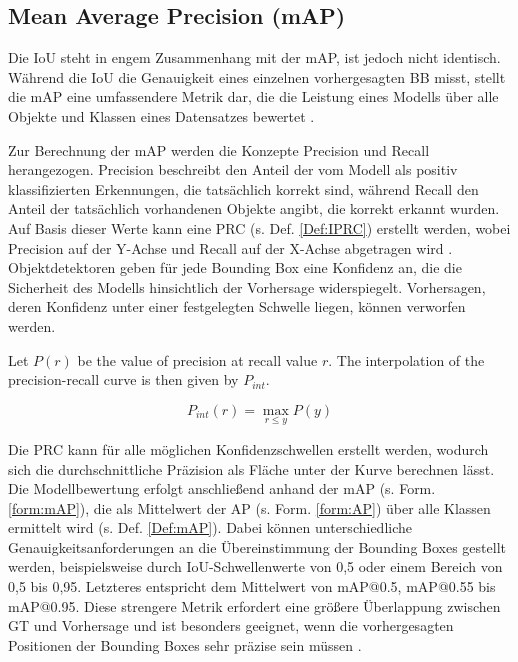 \subsection{Mean Average Precision (mAP)}

Die \acrlong{IoU} steht in engem Zusammenhang mit der \acrfull{mAP}, ist jedoch nicht identisch. Während die \acrshort{IoU} die Genauigkeit eines einzelnen vorhergesagten \acrshort{BB} misst, stellt die \acrshort{mAP} eine umfassendere Metrik dar, die die Leistung eines Modells über alle Objekte und Klassen eines Datensatzes bewertet \cite{ultralyics_iou}.

Zur Berechnung der \acrshort{mAP} werden die Konzepte Precision und Recall herangezogen. Precision beschreibt den Anteil der vom Modell als positiv klassifizierten Erkennungen, die tatsächlich korrekt sind, während Recall den Anteil der tatsächlich vorhandenen Objekte angibt, die korrekt erkannt wurden. Auf Basis dieser Werte kann eine \acrfull{PRC} (s. Def. \ref{Def:IPRC}) erstellt werden, wobei Precision auf der Y-Achse und Recall auf der X-Achse abgetragen wird \cite{Goodfellow-et-al-2016}. Objektdetektoren geben für jede Bounding Box eine Konfidenz an, die die Sicherheit des Modells hinsichtlich der Vorhersage widerspiegelt. Vorhersagen, deren Konfidenz unter einer festgelegten Schwelle liegen, können verworfen werden. 

\begin{definition}
\label{Def:IPRC}
Let $P(r)$ be the value of precision at recall value $r$. 
The interpolation of the precision-recall curve is then given by $P_{int}$.

\begin{equation}
P_{int}(r) = \max_{r \leq y} P(y)
\end{equation}
\end{definition}


Die \acrshort{PRC} kann für alle möglichen Konfidenzschwellen erstellt werden, wodurch sich die durchschnittliche Präzision als Fläche unter der Kurve berechnen lässt. Die Modellbewertung erfolgt anschließend anhand der \acrfull{mAP} (s. Form. \ref{form:mAP}), die als Mittelwert der \acrfull{AP} (s. Form. \ref{form:AP}) über alle Klassen ermittelt wird (s. Def. \ref{Def:mAP})\cite{Rainio2024}. Dabei können unterschiedliche Genauigkeitsanforderungen an die Übereinstimmung der Bounding Boxes gestellt werden, beispielsweise durch IoU-Schwellenwerte von 0,5 oder einem Bereich von 0,5 bis 0,95. Letzteres entspricht dem Mittelwert von \acrshort{mAP}@0.5, \acrshort{mAP}@0.55 bis \acrshort{mAP}@0.95. Diese strengere Metrik erfordert eine größere Überlappung zwischen \acrshort{GT} und Vorhersage und ist besonders geeignet, wenn die vorhergesagten Positionen der Bounding Boxes sehr präzise sein müssen \cite{Rainio2024}.


